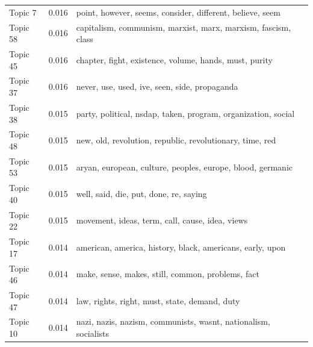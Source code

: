 \documentclass[12pt]{paper}
\begin{document}
\begin{table}[H]
\begin{adjustbox}{width=1\textwidth}
\begin{tabular}{lll}
	Topic 7                            & 0.016                                                  & point, however, seems, consider, different, believe, seem           \\
	Topic 58                           & 0.016                                                  & capitalism, communism, marxist, marx, marxism, fascism, class       \\
	Topic 45                           & 0.016                                                  & chapter, fight, existence, volume, hands, must, purity              \\
	Topic 37                           & 0.016                                                  & never, use, used, ive, seen, side, propaganda                       \\
	Topic 38                           & 0.015                                                  & party, political, nsdap, taken, program, organization, social       \\
	Topic 48                           & 0.015                                                  & new, old, revolution, republic, revolutionary, time, red            \\
	Topic 53                           & 0.015                                                  & aryan, european, culture, peoples, europe, blood, germanic          \\
	Topic 40                           & 0.015                                                  & well, said, die, put, done, re, saying                              \\
	Topic 22                           & 0.015                                                  & movement, ideas, term, call, cause, idea, views                     \\
	Topic 17                           & 0.014                                                  & american, america, history, black, americans, early, upon           \\
	Topic 46                           & 0.014                                                  & make, sense, makes, still, common, problems, fact                   \\
	Topic 47                           & 0.014                                                  & law, rights, right, must, state, demand, duty                       \\
	Topic 10                           & 0.014                                                  & nazi, nazis, nazism, communists, wasnt, nationalism, socialists     \\

\end{tabular}
\end{adjustbox}
\end{table}
\end{document}
